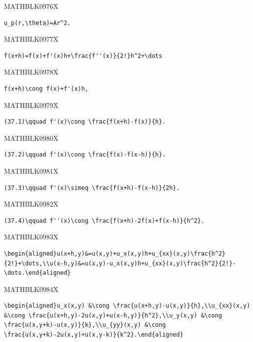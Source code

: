\documentclass[
  ukrainian,
]{article}
\begin{document}
MATHBLK0976X

\begin{verbatim}
u_p(r,\theta)=Ar^2.
\end{verbatim}

MATHBLK0977X

\begin{verbatim}
f(x+h)=f(x)+f'(x)h+\frac{f''(x)}{2!}h^2+\dots
\end{verbatim}

MATHBLK0978X

\begin{verbatim}
f(x+h)\cong f(x)+f'(x)h,
\end{verbatim}

MATHBLK0979X

\begin{verbatim}
(37.1)\qquad f'(x)\cong \frac{f(x+h)-f(x)}{h}.
\end{verbatim}

MATHBLK0980X

\begin{verbatim}
(37.2)\qquad f'(x)\cong \frac{f(x)-f(x-h)}{h}.
\end{verbatim}

MATHBLK0981X

\begin{verbatim}
(37.3)\qquad f'(x)\simeq \frac{f(x+h)-f(x-h)}{2h}.
\end{verbatim}

MATHBLK0982X

\begin{verbatim}
(37.4)\qquad f''(x)\cong \frac{f(x+h)-2f(x)+f(x-h)}{h^2}.
\end{verbatim}

MATHBLK0983X

\begin{verbatim}
\begin{aligned}u(x+h,y)&=u(x,y)+u_x(x,y)h+u_{xx}(x,y)\frac{h^2}{2!}+\dots,\\u(x-h,y)&=u(x,y)-u_x(x,y)h+u_{xx}(x,y)\frac{h^2}{2!}-\dots.\end{aligned}
\end{verbatim}

MATHBLK0984X

\begin{verbatim}
\begin{aligned}u_x(x,y) &\cong \frac{u(x+h,y)-u(x,y)}{h},\\u_{xx}(x,y) &\cong \frac{u(x+h,y)-2u(x,y)+u(x-h,y)}{h^2},\\u_y(x,y) &\cong \frac{u(x,y+k)-u(x,y)}{k},\\u_{yy}(x,y) &\cong \frac{u(x,y+k)-2u(x,y)+u(x,y-k)}{k^2}.\end{aligned}
\end{verbatim}
\end{document}
